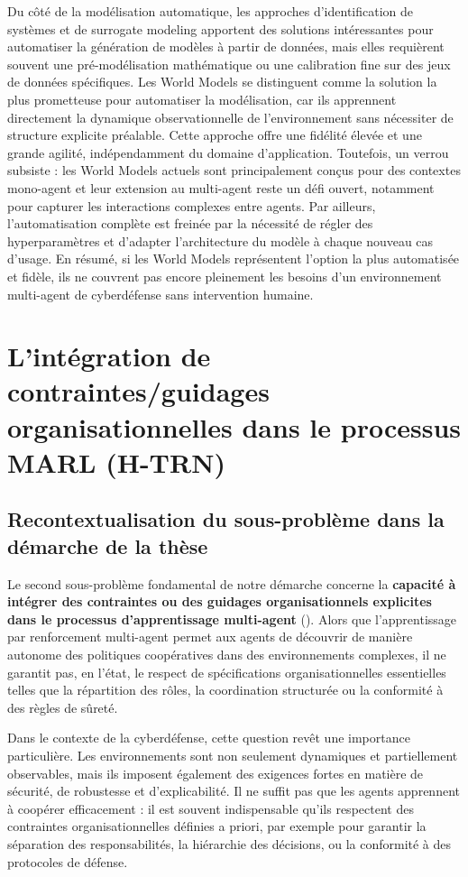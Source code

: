 Du côté de la modélisation automatique, les approches d’identification de systèmes et de surrogate modeling apportent des solutions intéressantes pour automatiser la génération de modèles à partir de données, mais elles requièrent souvent une pré-modélisation mathématique ou une calibration fine sur des jeux de données spécifiques. Les World Models se distinguent comme la solution la plus prometteuse pour automatiser la modélisation, car ils apprennent directement la dynamique observationnelle de l’environnement sans nécessiter de structure explicite préalable. Cette approche offre une fidélité élevée et une grande agilité, indépendamment du domaine d’application. Toutefois, un verrou subsiste : les World Models actuels sont principalement conçus pour des contextes mono-agent et leur extension au multi-agent reste un défi ouvert, notamment pour capturer les interactions complexes entre agents. Par ailleurs, l’automatisation complète est freinée par la nécessité de régler des hyperparamètres et d’adapter l’architecture du modèle à chaque nouveau cas d’usage. En résumé, si les World Models représentent l’option la plus automatisée et fidèle, ils ne couvrent pas encore pleinement les besoins d’un environnement multi-agent de cyberdéfense sans intervention humaine.

\section{L'intégration de contraintes/guidages organisationnelles dans le processus MARL (H-TRN)}

\subsection*{Recontextualisation du sous-problème dans la démarche de la thèse}

Le second sous-problème fondamental de notre démarche concerne la \textbf{capacité à intégrer des contraintes ou des guidages organisationnels explicites dans le processus d'apprentissage multi-agent} (). Alors que l'apprentissage par renforcement multi-agent permet aux agents de découvrir de manière autonome des politiques coopératives dans des environnements complexes, il ne garantit pas, en l'état, le respect de spécifications organisationnelles essentielles telles que la répartition des rôles, la coordination structurée ou la conformité à des règles de sûreté.

Dans le contexte de la cyberdéfense, cette question revêt une importance particulière. Les environnements sont non seulement dynamiques et partiellement observables, mais ils imposent également des exigences fortes en matière de sécurité, de robustesse et d'explicabilité. Il ne suffit pas que les agents apprennent à coopérer efficacement : il est souvent indispensable qu'ils respectent des contraintes organisationnelles définies a priori, par exemple pour garantir la séparation des responsabilités, la hiérarchie des décisions, ou la conformité à des protocoles de défense.

